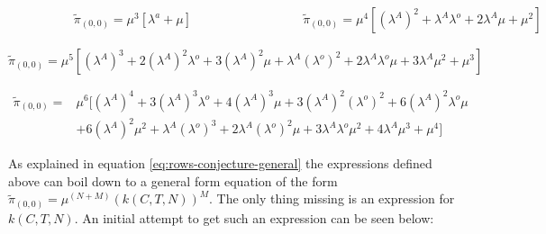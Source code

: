 \begin{multicols}{2}
    \begin{figure}[H]
        \centering
        \scalebox{0.9}{}
    \end{figure}
    \columnbreak
    \begin{figure}[H]
        \centering
        \scalebox{0.9}{}
    \end{figure}
\end{multicols}
\vspace{-0.5cm}
\begin{alignat}{2} \label{eq:00_rate_1131}
    \hspace{4em} & \tilde{\pi}_{(0,0)} = \mu^3[\lambda^a + \mu] \hspace{8em} & \tilde{\pi}_{(0,0)} = \mu^4[(\lambda^A)^2 + \lambda^A \lambda^o + 2\lambda^A \mu + \mu^2] 
\end{alignat}


\begin{figure}[h]
    \centering
    \scalebox{0.8}{}
\end{figure}
\begin{equation}\label{eq:00_rate_1141}
    \tilde{\pi}_{(0,0)} = \mu^5[(\lambda^A)^3 + 2(\lambda^A)^2 \lambda^o + 3(\lambda^A)^2 \mu + \lambda^A (\lambda^o)^2 + 2\lambda^A \lambda^o \mu + 3\lambda^A \mu^2 + \mu^3]
\end{equation}

\begin{figure}[h]
    \centering
    \scalebox{0.8}{}
\end{figure}
\begin{align}\label{eq:00_rate_1151}
    \tilde{\pi}_{(0,0)} =& \mu^6[(\lambda^A)^4 + 3(\lambda^A)^3 \lambda^o + 4(\lambda^A)^3 \mu + 3(\lambda^A)^2 (\lambda^o)^2 + 6(\lambda^A)^2 \lambda^o \mu \\
    & + 6(\lambda^A)^2 \mu^2 + \lambda^A (\lambda^o)^3 + 2\lambda^A (\lambda^o)^2 \mu + 3\lambda^A \lambda^o \mu^2 + 4\lambda^A \mu^3 + \mu^4] \nonumber
\end{align}

\newpage
As explained in equation \ref{eq:rows-conjecture-general} the expressions defined above can boil down to a general form equation of the form \(\tilde{\pi}_{(0,0)} = \mu^{(N+M)} (k(C,T,N))^M\). 
The only thing missing is an expression for \(k(C,T,N)\). 
An initial attempt to get such an expression can be seen below:

